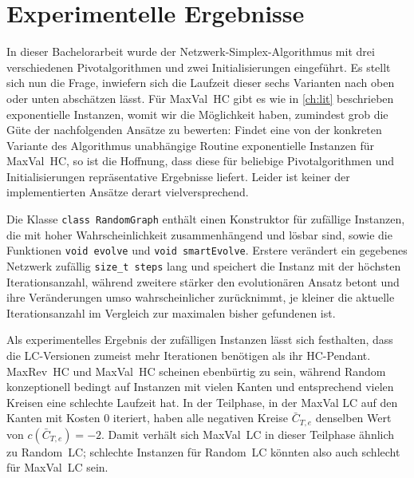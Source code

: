 \chapter{Experimentelle Ergebnisse}\label{ch:erg}
In dieser Bachelorarbeit wurde der Netzwerk-Simplex-Algorithmus mit drei verschiedenen Pivotalgorithmen und zwei Initialisierungen eingeführt. Es stellt sich nun die Frage, inwiefern sich die Laufzeit dieser sechs Varianten nach oben oder unten abschätzen lässt. Für MaxVal~HC gibt es wie in \cref{ch:lit} beschrieben exponentielle Instanzen, womit wir die Möglichkeit haben, zumindest grob die Güte der nachfolgenden Ansätze zu bewerten: Findet eine von der konkreten Variante des Algorithmus unabhängige Routine exponentielle Instanzen für MaxVal~HC, so ist die Hoffnung, dass diese für beliebige Pivotalgorithmen und Initialisierungen repräsentative Ergebnisse liefert. Leider ist keiner der implementierten Ansätze derart vielversprechend.

Die Klasse \lstinline|class RandomGraph| enthält einen Konstruktor für zufällige Instanzen, die mit hoher Wahrscheinlichkeit zusammenhängend und lösbar sind, sowie die Funktionen \lstinline|void evolve| und \lstinline|void smartEvolve|. Erstere verändert ein gegebenes Netzwerk zufällig \lstinline|size_t steps| lang und speichert die Instanz mit der höchsten Iterationsanzahl, während zweitere stärker den evolutionären Ansatz betont und ihre Veränderungen umso wahrscheinlicher zurücknimmt, je kleiner die aktuelle Iterationsanzahl im Vergleich zur maximalen bisher gefundenen ist.

Als experimentelles Ergebnis der zufälligen Instanzen lässt sich festhalten, dass die LC-Versionen zumeist mehr Iterationen benötigen als ihr HC-Pendant. MaxRev~HC und MaxVal~HC scheinen ebenbürtig zu sein, während Random konzeptionell bedingt auf Instanzen mit vielen Kanten und entsprechend vielen Kreisen eine schlechte Laufzeit hat. In der Teilphase, in der MaxVal LC auf den Kanten mit Kosten $0$ iteriert, haben alle negativen Kreise $\bar{C}_{T,e}$ denselben Wert von $c(\bar{C}_{T,e})=-2$. Damit verhält sich MaxVal~LC in dieser Teilphase ähnlich zu Random~LC; schlechte Instanzen für Random~LC könnten also auch schlecht für MaxVal~LC sein.

